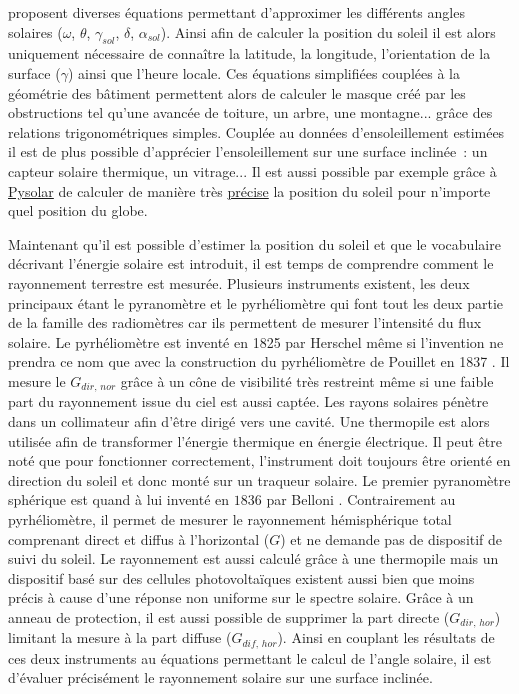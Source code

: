  proposent diverses équations permettant d’approximer
les différents angles solaires ($\omega$, $\theta$, $\gamma_{sol}$, $\delta$, $\alpha_{sol}$).
Ainsi afin de calculer la position du soleil il est alors uniquement nécessaire de connaître la latitude, la longitude,
l’orientation de la surface ($\gamma$) ainsi que l’heure locale. Ces équations simplifiées
couplées à la géométrie des bâtiment permettent alors de calculer le masque créé par les obstructions
tel qu’une avancée de toiture, un arbre, une montagne... grâce des relations trigonométriques simples.
Couplée au données d’ensoleillement estimées il est de plus possible d’apprécier l’ensoleillement
sur une surface inclinée~: un capteur solaire thermique, un vitrage...
Il est aussi possible par exemple grâce à \href{http://pysolar.org/}{Pysolar} de calculer
de manière très \href{http://docs.pysolar.org/en/latest/#validation}{précise} la
position du soleil pour n’importe quel position du globe.


Maintenant qu’il est possible d’estimer la position du soleil et que le vocabulaire
décrivant l’énergie solaire est introduit, il est temps de comprendre comment
le rayonnement terrestre est mesurée. Plusieurs instruments existent, les deux principaux
étant le pyranomètre et le pyrhéliomètre qui font tout les deux partie de la famille
des radiomètres car ils permettent de mesurer l’intensité du flux solaire.
Le pyrhéliomètre est inventé en 1825 par Herschel \parencite{Kutz2013} même si l’invention
ne prendra ce nom que avec la construction du pyrhéliomètre de Pouillet en 1837 \parencite{Boer1985}.
Il mesure le $G_{dir,\,nor}$ grâce à un cône de visibilité très
restreint même si une faible part du rayonnement issue du ciel est aussi captée.
Les rayons solaires pénètre dans un collimateur afin d’être dirigé vers une cavité.
Une thermopile est alors utilisée afin de transformer l’énergie thermique en énergie électrique.
Il peut être noté que pour fonctionner correctement, l’instrument doit toujours être orienté
en direction du soleil et donc monté sur un traqueur solaire.
Le premier pyranomètre sphérique est quand à lui inventé en $1836$ par Belloni \parencite{Boer1985}.
Contrairement au pyrhéliomètre, il permet de mesurer le rayonnement hémisphérique total
comprenant direct et diffus à l’horizontal ($G$) et ne demande pas de dispositif de
suivi du soleil. Le rayonnement est aussi calculé grâce à une thermopile mais un
dispositif basé sur des cellules photovoltaïques existent aussi bien que moins précis
à cause d’une réponse non uniforme sur le spectre solaire. Grâce à un anneau de protection,
il est aussi possible de supprimer la part directe ($G_{dir,\,hor}$) limitant la mesure
à la part diffuse ($G_{dif,\,hor}$). Ainsi en couplant les résultats de ces deux instruments
au équations permettant le calcul de l’angle solaire, il est d’évaluer précisément le
rayonnement solaire sur une surface inclinée.


